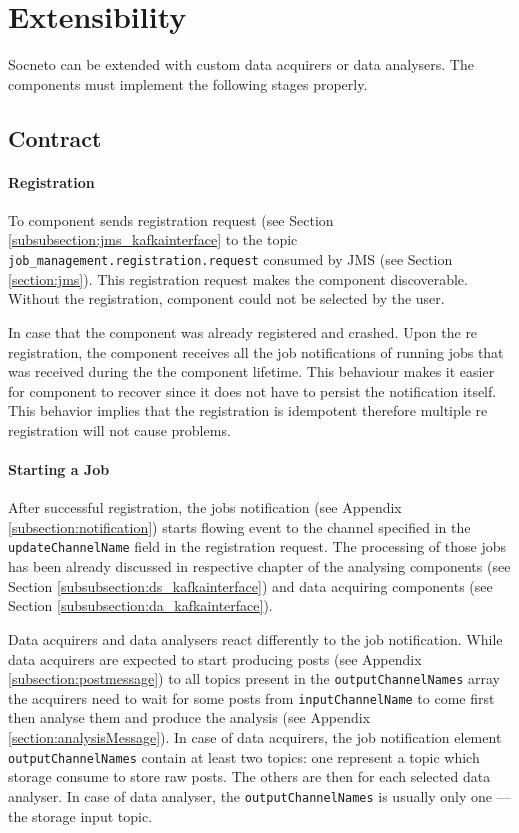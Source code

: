 \section{Extensibility}\label{section:extensibility}

Socneto can be extended with custom data acquirers or data analysers. The components must implement the following stages properly.

\subsection{Contract}

\paragraph{Registration}
To component sends registration request (see Section \ref{subsubsection:jms_kafkainterface} to the topic \texttt{job\_management.registration.request} consumed by JMS (see Section \ref{section:jms}). This registration request makes the component discoverable. Without the registration, component could not be selected by the user. 

In case that the component was already registered and crashed. Upon the re registration, the component receives all the job notifications of running jobs that was received during the the component lifetime. This behaviour makes it easier for component to recover since it does not have to persist the notification itself. This behavior implies that the registration is idempotent therefore multiple re registration will not cause problems.

\paragraph{Starting a Job} 
After successful registration, the jobs notification (see Appendix \ref{subsection:notification}) starts flowing event to the channel specified in the \newline\texttt{updateChannelName} field in the registration request. The processing of those jobs has been already discussed in respective chapter of the analysing components (see Section \ref{subsubsection:ds_kafkainterface}) and data acquiring components (see Section \ref{subsubsection:da_kafkainterface}).

Data acquirers and data analysers react differently to the job notification. While data acquirers are expected to start producing posts (see Appendix \ref{subsection:postmessage}) to all topics present in the \texttt{outputChannelNames} array the acquirers need to wait for some posts from \texttt{inputChannelName} to come first then analyse them and produce the analysis (see Appendix \ref{section:analysisMessage}). In case of data acquirers, the job notification element \texttt{outputChannelNames} contain at least two topics: one represent a topic which storage consume to store raw posts. The others are then for each selected data analyser. In case of data analyser, the \texttt{outputChannelNames} is usually only one --- the storage input topic.

